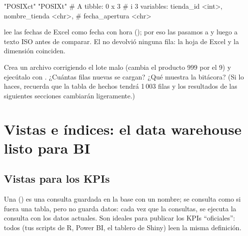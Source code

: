 
\begin{rsalida}
[1] "POSIXct" "POSIXt" 
# A tibble: 0 x 3
# i 3 variables: tienda_id <int>, nombre_tienda <chr>,
#   fecha_apertura <chr>
\end{rsalida}

 lee las fechas de Excel como fecha con hora
(); por eso las pasamos a  y luego a texto ISO
antes de comparar. El  no devolvió ninguna fila: la
hoja de Excel y la dimensión coinciden.

\begin{hazlotu}
Crea un archivo 
corrigiendo el lote malo (cambia el producto 999 por el 9) y ejecútalo con
. ¿Cuántas filas nuevas se cargan? ¿Qué muestra la
bitácora? (Si lo haces, recuerda que la tabla de hechos tendrá 1\,003 filas
y los resultados de las siguientes secciones cambiarán ligeramente.)
\end{hazlotu}

\section{Vistas e índices: el data warehouse listo para BI}
\label{sec:m5-vistas}

\subsection{Vistas para los KPIs}

Una  () es una consulta guardada en la
base con un nombre; se consulta como si fuera una tabla, pero no guarda
datos: cada vez que la consultas, se ejecuta la consulta con los datos
actuales. Son ideales para publicar los KPIs ``oficiales'': todos (tus
scripts de R, Power BI, el tablero de Shiny) leen la misma definición.

